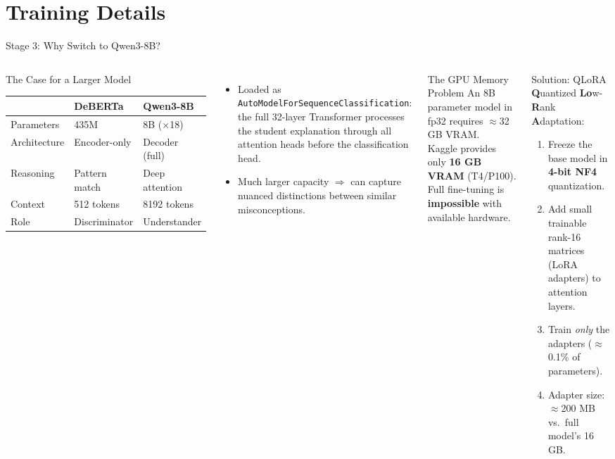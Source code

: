 \documentclass[aspectratio=169]{beamer}
\begin{document}
\section{Training Details}

\begin{frame}{Stage 3: Why Switch to Qwen3-8B?}
\begin{columns}[T]
\begin{block}{The Case for a Larger Model}
\begin{tabular}{lll}
\toprule
 & \textbf{DeBERTa} & \textbf{Qwen3-8B}\\
\midrule
Parameters & 435M & 8B ($\times$18)\\
Architecture & Encoder-only & Decoder (full)\\
Reasoning & Pattern match & Deep attention\\
Context & 512 tokens & 8192 tokens\\
Role & Discriminator & Understander\\
\bottomrule
\end{tabular}
\end{block}
\vspace{8pt}
\begin{itemize}
  \item Loaded as \texttt{AutoModelForSequenceClassification}: the full 32-layer Transformer processes the student explanation through all attention heads before the classification head.
  \item Much larger capacity $\Rightarrow$ can capture nuanced distinctions between similar misconceptions.
\end{itemize}
\begin{alertblock}{The GPU Memory Problem}
An 8B parameter model in fp32 requires $\approx$32 GB VRAM.\\
Kaggle provides only \textbf{16 GB VRAM} (T4/P100).\\[6pt]
Full fine-tuning is \textbf{impossible} with available hardware.
\end{alertblock}
\vspace{8pt}
\begin{exampleblock}{Solution: QLoRA}
\textbf{Q}uantized \textbf{Lo}w-\textbf{R}ank \textbf{A}daptation:\\
\begin{enumerate}
  \item Freeze the base model in \textbf{4-bit NF4} quantization.
  \item Add small trainable rank-16 matrices (LoRA adapters) to attention layers.
  \item Train \textit{only} the adapters ($\approx$0.1\% of parameters).
  \item Adapter size: $\approx$200 MB vs.\ full model's 16 GB.
\end{enumerate}
\end{exampleblock}
\end{columns}
\end{frame}
\end{document}
